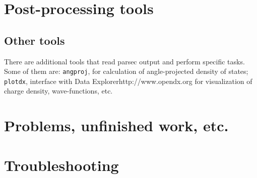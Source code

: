 \documentclass{article}
\begin{document}
\section{Post-processing tools}

%

\subsection{Other tools}

There are additional tools that read parsec output and perform specific
tasks. Some of them are: {\tt angproj}, for calculation of angle-projected
density of states; {\tt plotdx}, interface with
{Data Explorer}{http://www.opendx.org} for visualization
of charge density, wave-functions, etc.









\section{Problems, unfinished work, etc.}
\label{KnownProblems}









\section{Troubleshooting}
\end{document}
